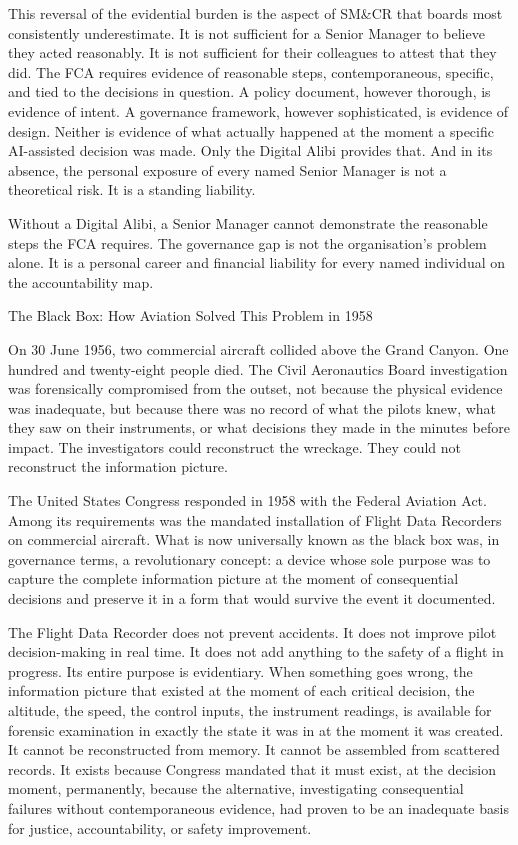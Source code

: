 This reversal of the evidential burden is the aspect of SM\&CR that boards most consistently underestimate. It is not sufficient for a Senior Manager to believe they acted reasonably. It is not sufficient for their colleagues to attest that they did. The FCA requires evidence of reasonable steps, contemporaneous, specific, and tied to the decisions in question. A policy document, however thorough, is evidence of intent. A governance framework, however sophisticated, is evidence of design. Neither is evidence of what actually happened at the moment a specific AI-assisted decision was made. Only the Digital Alibi provides that. And in its absence, the personal exposure of every named Senior Manager is not a theoretical risk. It is a standing liability.

Without a Digital Alibi, a Senior Manager cannot demonstrate the reasonable steps the FCA requires. The governance gap is not the organisation's problem alone. It is a personal career and financial liability for every named individual on the accountability map.

The Black Box: How Aviation Solved This Problem in 1958

On 30 June 1956, two commercial aircraft collided above the Grand Canyon. One hundred and twenty-eight people died. The Civil Aeronautics Board investigation was forensically compromised from the outset, not because the physical evidence was inadequate, but because there was no record of what the pilots knew, what they saw on their instruments, or what decisions they made in the minutes before impact. The investigators could reconstruct the wreckage. They could not reconstruct the information picture.

The United States Congress responded in 1958 with the Federal Aviation Act. Among its requirements was the mandated installation of Flight Data Recorders on commercial aircraft. What is now universally known as the black box was, in governance terms, a revolutionary concept: a device whose sole purpose was to capture the complete information picture at the moment of consequential decisions and preserve it in a form that would survive the event it documented.

The Flight Data Recorder does not prevent accidents. It does not improve pilot decision-making in real time. It does not add anything to the safety of a flight in progress. Its entire purpose is evidentiary. When something goes wrong, the information picture that existed at the moment of each critical decision, the altitude, the speed, the control inputs, the instrument readings, is available for forensic examination in exactly the state it was in at the moment it was created. It cannot be reconstructed from memory. It cannot be assembled from scattered records. It exists because Congress mandated that it must exist, at the decision moment, permanently, because the alternative, investigating consequential failures without contemporaneous evidence, had proven to be an inadequate basis for justice, accountability, or safety improvement.

